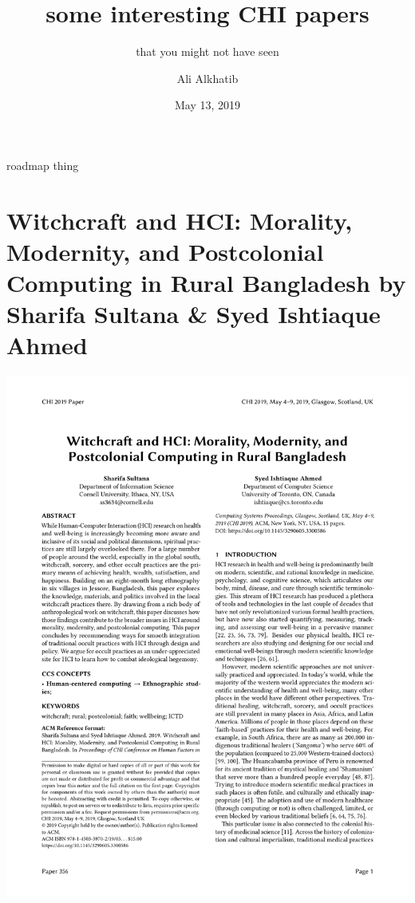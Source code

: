 \documentclass[aspectratio=169,10pt]{beamer} %
\title{some interesting CHI papers}
\subtitle{that you might not have seen}
\author{Ali Alkhatib}
\institute[RWF]{Reading With Friends}
\date{May 13, 2019}
\newcommand{\onlyinsubfile}[1]{#1}
\newcommand{\notinsubfile}[1]{}
\begin{document}
\renewcommand{\onlyinsubfile}[1]{}
\renewcommand{\notinsubfile}[1]{#1}
\begin{frame}
\titlepage
\end{frame} 




\begin{frame}{roadmap thing}
     \tableofcontents
\end{frame}


\section[Witchcraft and HCI: Morality, Modernity, and Postcolonial Computing in Rural Bangladesh]{Witchcraft and HCI: Morality, Modernity, and Postcolonial Computing in Rural Bangladesh {\scriptsize \color{Black} by \textbf{Sharifa Sultana} \& \textbf{Syed Ishtiaque Ahmed}}}

\begin{frame}[t] %
\includegraphics[width=\textwidth]{pdfs/witchcraft.pdf}
\end{frame}
\end{document}

